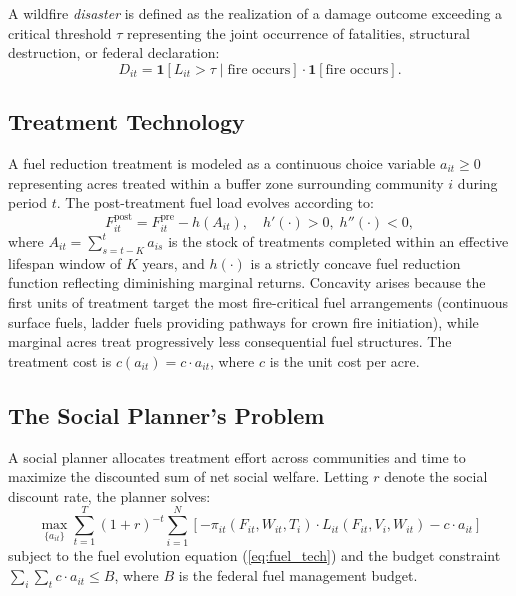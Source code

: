 \documentclass[12pt, letterpaper]{article}
\begin{document}
A wildfire \textit{disaster} is defined as the realization of a damage outcome exceeding a critical threshold $\tau$ representing the joint occurrence of fatalities, structural destruction, or federal declaration:
\begin{equation}
D_{it} = \mathbf{1}[L_{it} > \tau \mid \text{fire occurs}] \cdot \mathbf{1}[\text{fire occurs}].
\label{eq:disaster_def}
\end{equation}

\subsection{Treatment Technology}

A fuel reduction treatment is modeled as a continuous choice variable $a_{it} \geq 0$ representing acres treated within a buffer zone surrounding community $i$ during period $t$. The post-treatment fuel load evolves according to:
\begin{equation}
F_{it}^{\text{post}} = F_{it}^{\text{pre}} - h(A_{it}), \quad h'(\cdot) > 0, \; h''(\cdot) < 0,
\label{eq:fuel_tech}
\end{equation}
where $A_{it} = \sum_{s=t-K}^{t} a_{is}$ is the stock of treatments completed within an effective lifespan window of $K$ years, and $h(\cdot)$ is a strictly concave fuel reduction function reflecting diminishing marginal returns. Concavity arises because the first units of treatment target the most fire-critical fuel arrangements (continuous surface fuels, ladder fuels providing pathways for crown fire initiation), while marginal acres treat progressively less consequential fuel structures. The treatment cost is $c(a_{it}) = c \cdot a_{it}$, where $c$ is the unit cost per acre.

\subsection{The Social Planner's Problem}

A social planner allocates treatment effort across communities and time to maximize the discounted sum of net social welfare. Letting $r$ denote the social discount rate, the planner solves:
\begin{equation}
\max_{\{a_{it}\}} \sum_{t=1}^{T} (1+r)^{-t} \sum_{i=1}^{N} \left[ -\pi_{it}(F_{it}, W_{it}, T_i) \cdot L_{it}(F_{it}, V_i, W_{it}) - c \cdot a_{it} \right]
\label{eq:social_planner}
\end{equation}
subject to the fuel evolution equation (\ref{eq:fuel_tech}) and the budget constraint $\sum_i \sum_t c \cdot a_{it} \leq B$, where $B$ is the federal fuel management budget.
\end{document}
